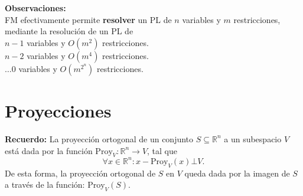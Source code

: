 \large{\textbf{Observaciones:}}\\
FM efectivamente permite \textbf{resolver} un PL de $n$ variables y $m$ restricciones, mediante la resolución de un PL de\\
$n-1$ variables y $O(m^2)$ restricciones.\\
$n-2$ variables y $O(m^4)$ restricciones.\\
$\ldots 0$ variables y $O(m^{2^n})$ restricciones.


















\section{Proyecciones}

\textbf{Recuerdo: } La proyección ortogonal de un conjunto $S \subseteq \mathbb{R}^n$ a un subespacio $V$ está dada por la función $\text{Proy}_{V}:\mathbb{R}^{n}\rightarrow V$, tal que
$$\forall x \in \mathbb{R}^n: x-\text{Proy}_{V}(x)\bot V.$$
De esta forma, la proyección ortogonal de $S$ en $V$ queda dada por la imagen de $S$ a través de la función: $\text{Proy}_{V}(S)$.\\

